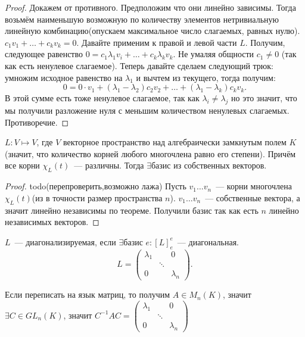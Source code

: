 \begin{proof}
    Докажем от противного. Предположим что они линейно зависимы. Тогда возьмём наименьшую возможную по количеству элементов
    нетривиальную линейную комбинацию(опускаем максимальное число слагаемых, равных нулю).
    $c_1v_1+\dots+c_kv_k = 0$. Давайте применим к правой и левой части $L$. Получим, следующее равенство
    $0 = c_1\lambda_1v_i+\dots + c_k\lambda_kv_k$. Не умаляя общности $c_1\not=0$ (так как есть ненулевое слагаемое).
    Теперь давайте сделаем следующий трюк: умножим исходное равенство на $\lambda_1$ и вычтем из текущего, тогда получим:
    \[
    0 = 0\cdot v_1 + (\lambda_1 - \lambda_2)c_2v_2 + \dots + (\lambda_1 - \lambda_k) c_k v_k
    .\]
    В этой сумме есть тоже ненулевое слагаемое, так как $\lambda_i \not= \lambda_j$ но это значит, что мы получили
    разложение нуля с меньшим количеством ненулевых слагаемых. Противоречие.
\end{proof}
\begin{follow}
    $L\colon V \mapsto V$, где $V$ векторное пространство над алгебраически замкнутым полем $K$(значит, что количество корней
    любого многочлена равно его степени). Причём все корни $\chi_L(t)$~--- различны.
    Тогда $\exists \text{базис из собственных векторов}$.
\end{follow}
\begin{proof}
    todo(перепроверить,возможно лажа)
    Пусть $v_1\dots v_n$~--- корни многочлена $\chi_L(t)$(из в точности размер пространства $n$).
    $v_1\dots v_n$~--- собственные вектора, а значит линейно независимы по теореме. Получили базис так как есть
    $n$ линейно независимых векторов.
\end{proof}
\begin{definition}
    $L$~--- диагонализируемая, если $\exists \text{базис $e$}\colon [L]^e_e$~--- диагональная.
    \[
        L = 
        \begin{pmatrix}
            \lambda_1&&0\\
            &\ddots &\\
            0& & \lambda_n
        \end{pmatrix}
    .\] 

    Если переписать на язык матриц, то получим $A\in M_n(K)$, значит $\exists C\in GL_n(K)$, значит $C^{-1}AC = 
    \begin{pmatrix}
        \lambda_1&&0\\
        &\ddots &\\
        0& & \lambda_n
    \end{pmatrix} $
\end{definition}
